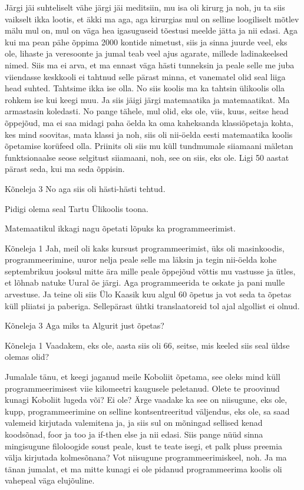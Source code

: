 Järgi jäi suhteliselt vähe järgi jäi meditsiin, mu isa oli kirurg ja noh, ju ta siis vaikselt ikka lootis, et äkki ma aga, aga kirurgias mul on selline loogiliselt mõtlev mälu mul on, mul on väga hea igasuguseid tõestusi meelde jätta ja nii edasi. Aga kui ma pean pähe õppima 2000 kontide nimetust, siis ja sinna juurde veel, eks ole, lihaste ja veresoonte ja jumal teab veel ajus agarate, millede ladinakeelsed nimed. Siis ma ei arva, et ma ennast väga hästi tunneksin ja peale selle me juba viiendasse keskkooli ei tahtnud selle pärast minna, et vanematel olid seal liiga head suhted. Tahtsime ikka ise olla. No siis koolis ma ka tahtsin ülikoolis olla rohkem ise kui keegi muu. Ja siis jäigi järgi matemaatika ja matemaatikat. Ma armastasin koledasti. No pange tähele, mul olid, eks ole, viis, kuus, seitse head õppejõud, ma ei saa midagi paha öelda ka oma kaheksanda klassiõpetaja kohta, kes mind soovitas, mata klassi ja noh, siis oli nii-öelda eesti matemaatika koolis õpetamise korüfeed olla. Priinits oli siis mu küll tundmumale siiamaani mäletan funktsionaalse seose selgitust siiamaani, noh, see on siis, eks ole. Ligi 50 aastat pärast seda, kui ma seda õppisin. 

Kõneleja 3
No aga siis oli hästi-hästi tehtud. 

Pidigi olema seal Tartu Ülikoolis toona. 

Matemaatikul ikkagi nagu õpetati lõpuks ka programmeerimist. 

Kõneleja 1
Jah, meil oli kaks kursust programmeerimist, üks oli masinkoodis, programmeerimine, uuror nelja peale selle ma läksin ja tegin nii-öelda kohe septembrikuu jooksul mitte ära mille peale õppejõud võttis mu vastusse ja ütles, et lõhnab natuke Uural õe järgi. Aga programmeerida te oskate ja pani mulle arvestuse. Ja teine oli siis Ülo Kaasik kuu algul 60 õpetus ja vot seda ta õpetas küll pliiatsi ja paberiga. Sellepärast ühtki translaatoreid tol ajal algollist ei olnud. 

Kõneleja 3
Aga miks ta Algurit just õpetas? 

Kõneleja 1
Vaadakem, eks ole, aasta siis oli 66, seitse, mis keeled siis seal üldse olemas olid? 

Jumalale tänu, et keegi jaganud meile Koboliit õpetama, see oleks mind küll programmeerimisest viie kilomeetri kaugusele peletanud. Olete te proovinud kunagi Koboliit lugeda või? Ei ole? Ärge vaadake ka see on niisugune, eks ole, kupp, programmeerimine on selline kontsentreeritud väljendus, eks ole, sa saad valemeid kirjutada valemitena ja, ja siis sul on mõningad sellised kenad koodsõnad, foor ja too ja if-then else ja nii edasi. Siis pange nüüd sinna mingisugune filoloogide soust peale, kust te teate isegi, et palk pluss preemia välja kirjutada kolmesõnana? Vot niisugune programmeerimiskeel, noh. Ja ma tänan jumalat, et ma mitte kunagi ei ole pidanud programmeerima koolis oli vahepeal väga elujõuline. 

